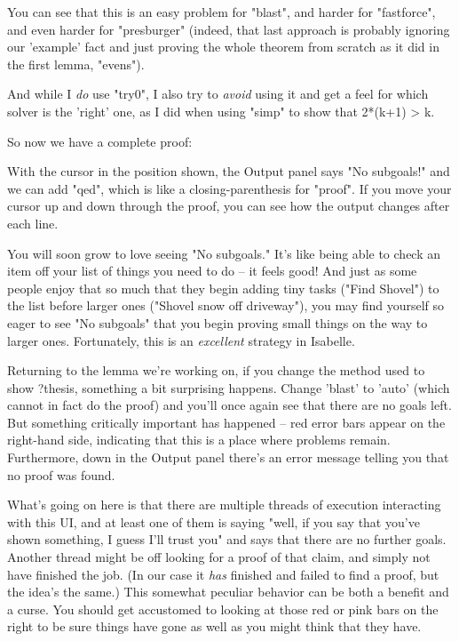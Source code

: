 You can see that this is an easy problem for "blast", and harder for "fastforce", and even harder for "presburger" (indeed, that last approach is probably ignoring our 'example' fact and just proving the whole theorem from scratch as it did in the first lemma, "evens"). 

And while I \textit{do} use "try0", I also try to \textit{avoid} using it and get a feel for which solver is the 'right' one, as I did when using "simp" to show that 2*(k+1) > k. 

So now we have a complete proof:

With the cursor in the position shown, the Output panel says "No subgoals!" and we can add "qed", which is like a closing-parenthesis for "proof". If you move your cursor up and down through the proof, you can see how the output changes after each line. 

You will soon grow to love seeing "No subgoals." It's like being able to check an item off your list of things you need to do -- it feels good! And just as some people enjoy that so much that they begin adding tiny tasks ("Find Shovel") to the list before larger ones ("Shovel snow off driveway"), you may find yourself so eager to see "No subgoals" that you begin proving small things on the way to larger ones. Fortunately, this is an \textit{excellent} strategy in Isabelle. 

Returning to the lemma we're working on, if you change the method used to show ?thesis, something a bit surprising happens. Change 'blast' to 'auto' (which cannot in fact do the proof) and you'll once again see that there are no goals left. But something critically important has happened -- red error bars appear on the right-hand side, indicating that this is a place where problems remain. Furthermore, down in the Output panel there's an error message telling you that no proof was found. 

What's going on here is that there are multiple threads of execution interacting with this UI, and at least one of them is saying "well, if you say that you've shown something, I guess I'll trust you" and says that there are no further goals. Another thread might be off looking for a proof of that claim, and simply not have finished the job. (In our case it \textit{has} finished and failed to find a proof, but the idea's the same.) This somewhat peculiar behavior can be both a benefit and a curse. You should get accustomed to looking at those red or pink bars on the right to be sure things have gone as well as you might think that they have. 

